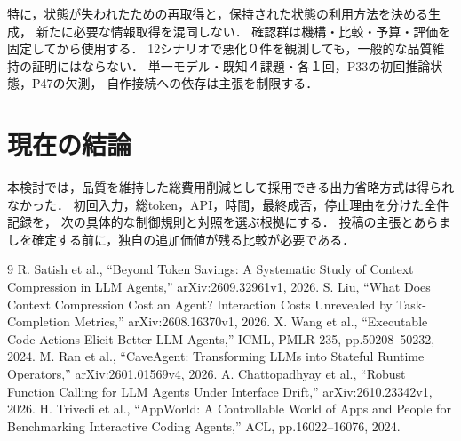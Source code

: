 \documentclass[uplatex,a4paper,twocolumn,10pt]{jsarticle}
\begin{document}
特に，状態が失われたための再取得と，保持された状態の利用方法を決める生成，
新たに必要な情報取得を混同しない．
確認群は機構・比較・予算・評価を固定してから使用する．
12シナリオで悪化０件を観測しても，一般的な品質維持の証明にはならない．
単一モデル・既知４課題・各１回，P33の初回推論状態，P47の欠測，
自作接続への依存は主張を制限する．

\section{現在の結論}
本検討では，品質を維持した総費用削減として採用できる出力省略方式は得られなかった．
初回入力，総token，API，時間，最終成否，停止理由を分けた全件記録を，
次の具体的な制御規則と対照を選ぶ根拠にする．
投稿の主張とあらましを確定する前に，独自の追加価値が残る比較が必要である．

\begin{thebibliography}{9}\small
{} R. Satish et al., ``Beyond Token Savings: A Systematic Study of Context Compression in LLM Agents,'' arXiv:2609.32961v1, 2026.
 S. Liu, ``What Does Context Compression Cost an Agent? Interaction Costs Unrevealed by Task-Completion Metrics,'' arXiv:2608.16370v1, 2026.
 X. Wang et al., ``Executable Code Actions Elicit Better LLM Agents,'' ICML, PMLR 235, pp.50208--50232, 2024.
 M. Ran et al., ``CaveAgent: Transforming LLMs into Stateful Runtime Operators,'' arXiv:2601.01569v4, 2026.
 A. Chattopadhyay et al., ``Robust Function Calling for LLM Agents Under Interface Drift,'' arXiv:2610.23342v1, 2026.
 H. Trivedi et al., ``AppWorld: A Controllable World of Apps and People for Benchmarking Interactive Coding Agents,'' ACL, pp.16022--16076, 2024.
\end{thebibliography}
\end{document}
